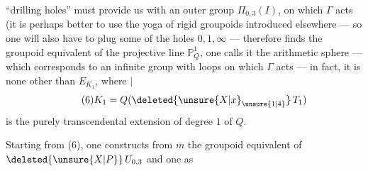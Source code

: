 ``drilling holes'' must provide us with an outer group $\Pi_{0,3}(I)$,  on which $\Gamma$ acts (it is perhaps better to use the yoga of rigid groupoids introduced elsewhere — so one   will also have to plug some of the holes $0,1,\infty$ —  therefore finds the groupoid equivalent of the  projective line $\mathbb P^1_Q$, one calls it the arithmetic sphere — which corresponds to an infinite  group with loops on which $\Gamma$ acts — in fact, it is none other than $E_{K_1}$, where $\vert$
\[
\tag{6}K_1=Q(\deleted{\unsure{X|x}_{\unsure{1|4}}}\,T_1)
\]
is the  purely transcendental extension of degree $1$ of $Q$.

Starting from (6), one constructs from $\overline m$ the groupoid equivalent of $\deleted{\unsure{X|P}}\,U_{0,3}$  and one  as
